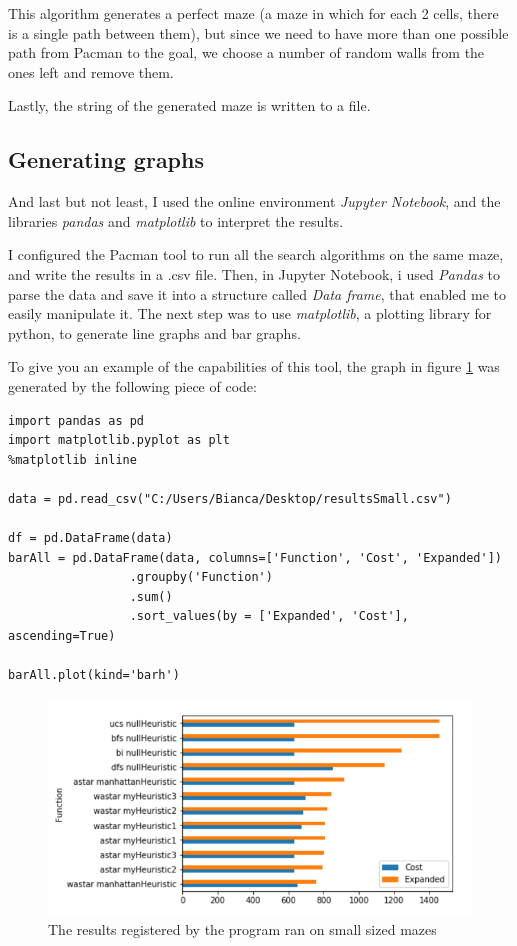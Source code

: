 \documentclass[a4paper,12pt]{report}
\begin{document}
This algorithm generates a perfect maze (a maze in which for each 2 cells, there is a single path between them), but since we need to have more than one possible path from Pacman to the goal, we choose a number of random walls from the ones left and remove them.

Lastly, the string of the generated maze is written to a file.

\subsection{Generating graphs}

And last but not least, I used the online environment \textit{Jupyter Notebook}, and the libraries \textit{pandas} and \textit{matplotlib} to interpret the results. 

I configured the Pacman tool to run all the search algorithms on the same maze, and write the results in a .csv file. Then, in Jupyter Notebook, i used \textit{Pandas} to parse the data and save it into a structure called \textit{Data frame}, that enabled me to easily manipulate it. The next step was to use \textit{matplotlib}, a plotting library for python, to generate line graphs and bar graphs.

To give you an example of the capabilities of this tool, the graph in figure \ref{fig:pic2} was generated by the following piece of code:

\begin{verbatim} 
import pandas as pd
import matplotlib.pyplot as plt
%matplotlib inline

data = pd.read_csv("C:/Users/Bianca/Desktop/resultsSmall.csv")

df = pd.DataFrame(data)
barAll = pd.DataFrame(data, columns=['Function', 'Cost', 'Expanded'])
                 .groupby('Function')
                 .sum()
                 .sort_values(by = ['Expanded', 'Cost'], ascending=True)

barAll.plot(kind='barh')
\end{verbatim}

\begin{figure}[h!]
   \centering
    \includegraphics[width=\linewidth]{pictures/small/small1.png}
    \caption{The results registered by the program ran on small sized mazes}
  \label{fig:pic2}
\end{figure}
\vspace{0.5cm}
\end{document}
